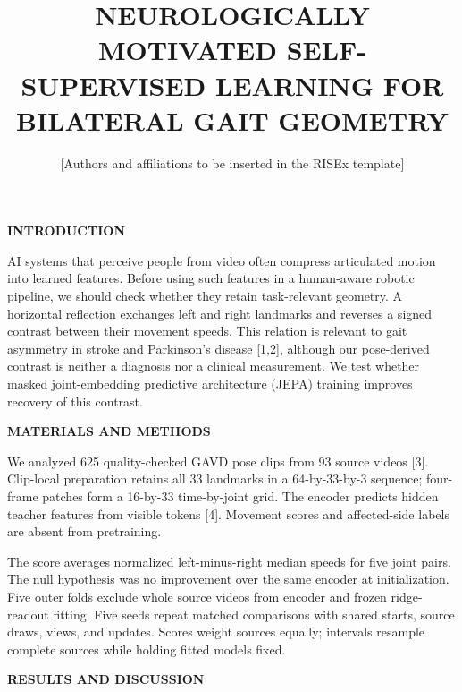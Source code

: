 \documentclass[11pt,letterpaper]{article}
\title{\vspace{-1.2em}\textbf{\MakeUppercase{Neurologically Motivated
Self-Supervised Learning for Bilateral Gait Geometry}}\vspace{-0.5em}}
\author{\normalsize [Authors and affiliations to be inserted in the RISEx template]}
\date{}
\renewcommand{\subsection}[1]{\vspace{2pt}\noindent\textbf{#1}\par\vspace{1pt}}
\begin{document}
\twocolumn[
  \begin{@twocolumnfalse}
  \maketitle
  \vspace{-1.1em}
  \end{@twocolumnfalse}
]
\subsection{INTRODUCTION}\label{introduction}

AI systems that perceive people from video often compress articulated
motion into learned features. Before using such features in a
human-aware robotic pipeline, we should check whether they retain
task-relevant geometry. A horizontal reflection exchanges left and right
landmarks and reverses a signed contrast between their movement speeds.
This relation is relevant to gait asymmetry in stroke and Parkinson's
disease {[}1,2{]}, although our pose-derived contrast is neither a
diagnosis nor a clinical measurement. We test whether masked
joint-embedding predictive architecture (JEPA) training improves
recovery of this contrast.

\subsection{MATERIALS AND METHODS}\label{materials-and-methods}

We analyzed 625 quality-checked GAVD pose clips from 93 source videos
{[}3{]}. Clip-local preparation retains all 33 landmarks in a
64-by-33-by-3 sequence; four-frame patches form a 16-by-33 time-by-joint
grid. The encoder predicts hidden teacher features from visible tokens
{[}4{]}. Movement scores and affected-side labels are absent from
pretraining.

The score averages normalized left-minus-right median speeds for five
joint pairs. The null hypothesis was no improvement over the same
encoder at initialization. Five outer folds exclude whole source videos
from encoder and frozen ridge-readout fitting. Five seeds repeat matched
comparisons with shared starts, source draws, views, and updates. Scores
weight sources equally; intervals resample complete sources while
holding fitted models fixed.

\subsection{RESULTS AND DISCUSSION}\label{results-and-discussion}
\end{document}
